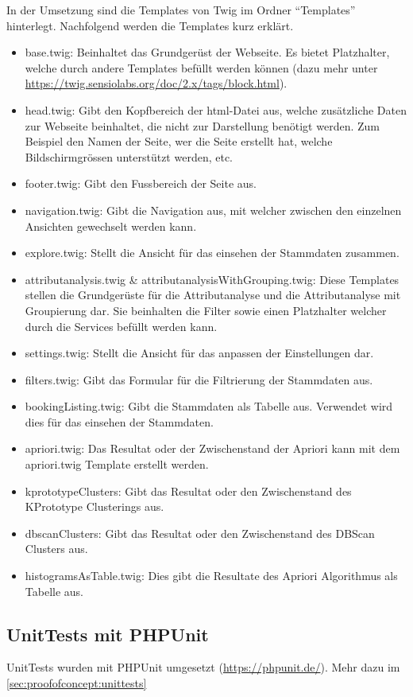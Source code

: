 In der Umsetzung sind die Templates von Twig im Ordner "`Templates"' hinterlegt. Nachfolgend werden die Templates kurz erklärt.
\begin{itemize}
	\item base.twig: Beinhaltet das Grundgerüst der Webseite. Es bietet Platzhalter, welche durch andere Templates befüllt werden können (dazu mehr unter \url{https://twig.sensiolabs.org/doc/2.x/tags/block.html}).
	\item head.twig: Gibt den Kopfbereich der \gls{html}-Datei aus, welche zusätzliche Daten zur Webseite beinhaltet, die nicht zur Darstellung benötigt werden. Zum Beispiel den Namen der Seite, wer die Seite erstellt hat, welche Bildschirmgrössen unterstützt werden, etc.
	\item footer.twig: Gibt den Fussbereich der Seite aus. 
	\item navigation.twig: Gibt die Navigation aus, mit welcher zwischen den einzelnen Ansichten gewechselt werden kann.
	\item explore.twig: Stellt die Ansicht für das einsehen der Stammdaten zusammen. 
	\item attributanalysis.twig \& attributanalysisWithGrouping.twig: Diese Templates stellen die Grundgerüste für die Attributanalyse und die Attributanalyse mit Groupierung dar. Sie beinhalten die Filter sowie einen Platzhalter welcher durch die Services befüllt werden kann.
	\item settings.twig: Stellt die Ansicht für das anpassen der Einstellungen dar. 
	\item filters.twig: Gibt das Formular für die Filtrierung der Stammdaten aus.
	\item bookingListing.twig: Gibt die Stammdaten als Tabelle aus. Verwendet wird dies für das einsehen der Stammdaten.
	\item apriori.twig: Das Resultat oder der Zwischenstand der Apriori kann mit dem apriori.twig Template erstellt werden.
	\item kprototypeClusters: Gibt das Resultat oder den Zwischenstand des KPrototype Clusterings aus.
	\item dbscanClusters: Gibt das Resultat oder den Zwischenstand des DBScan Clusters aus.
	\item histogramsAsTable.twig: Dies gibt die Resultate des Apriori Algorithmus als Tabelle aus. 
\end{itemize}

\subsection{UnitTests mit PHPUnit}
\label{sec:proofofconcept:externebibliotheken:phpunit}
UnitTests wurden mit PHPUnit umgesetzt (\url{https://phpunit.de/}). Mehr dazu im \cref{sec:proofofconcept:unittests} 

